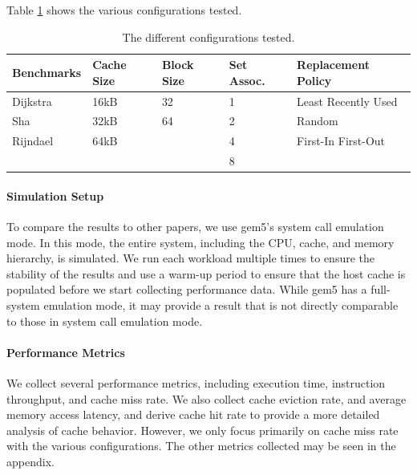 \documentclass[conference]{IEEEtran}
\begin{document}
Table \ref{table:configurations} shows the various configurations tested. 

\begin{table}[H]
  \centering
  \begin{tabular}{| m{1.6cm} | m{.75cm} | m{.75cm} | m{.8cm} | m{2.6cm} |}
      \hline
      \textbf{Benchmarks} & \textbf{Cache Size} & \textbf{Block Size}& \textbf{Set Assoc.}& \textbf{Replacement Policy} \\ \hline
      Dijkstra    &   16kB  &   32    &  1   &    Least Recently Used     \\ \hline
      Sha         &   32kB  &   64    &  2   &    Random                  \\ \hline
      Rijndael    &   64kB  &         &  4   &    First-In First-Out      \\ \hline
                  &         &         &  8   &                            \\ \hline 
  \end{tabular}
  \vspace{2mm}
  \caption{The different configurations tested.}
  \label{table:configurations}
\end{table}

\paragraph{Simulation Setup}
To compare the results to other papers, we use gem5's system call emulation mode. In this mode, the entire system, including the CPU, cache, and memory hierarchy, is simulated. We run each workload multiple times to ensure the stability of the results and use a warm-up period to ensure that the host cache is populated before we start collecting performance data. While gem5 has a full-system emulation mode, it may provide a result that is not directly comparable to those in system call emulation mode.

\paragraph{Performance Metrics}
We collect several performance metrics, including execution time, instruction throughput, and cache miss rate. We also collect cache eviction rate, and average memory access latency, and derive cache hit rate to provide a more detailed analysis of cache behavior. However, we only focus primarily on cache miss rate with the various configurations. The other metrics collected may be seen in the appendix.
\end{document}
